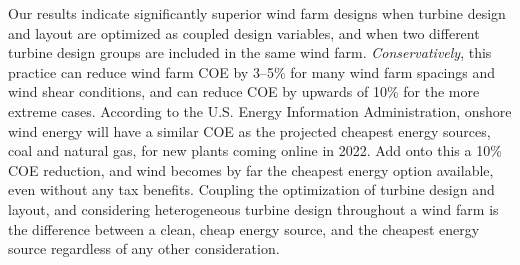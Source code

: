 Our results indicate significantly superior wind farm designs when turbine design and layout are optimized as coupled design variables, and when two different turbine design groups are included in the same wind farm. \textit{Conservatively}, this practice can reduce wind farm COE by 3--5\% for many wind farm spacings and wind shear conditions, and can reduce COE by upwards of 10\% for the more extreme cases.
According to the U.S. Energy Information Administration, onshore wind energy will have a similar COE as the projected cheapest energy sources, coal and natural gas, for new plants coming online in 2022\cite{levelized}. Add onto this a 10\% COE reduction, and wind becomes by far the cheapest energy option available, even without any tax benefits. Coupling the optimization of turbine design and layout, and considering heterogeneous turbine design throughout a wind farm is the difference between a clean, cheap energy source, and the cheapest energy source regardless of any other consideration. 

